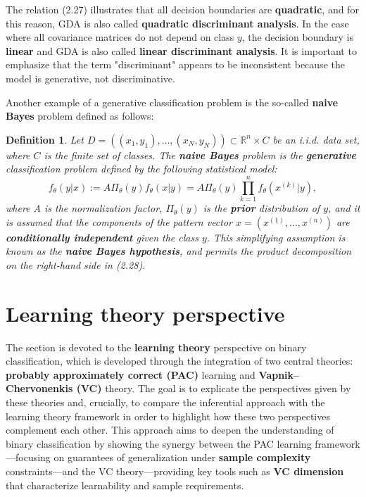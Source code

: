 \documentclass{report}
\newtheorem{definition}{Definition}[chapter]
\begin{document}
The relation (2.27) illustrates that all decision boundaries are \textbf{quadratic}, and for this reason, GDA is also called \textbf{quadratic discriminant analysis}. In the case where all covariance matrices do not depend on class $y$, the decision boundary is \textbf{linear} and GDA is also called \textbf{linear discriminant analysis}. It is important to emphasize that the term "discriminant" appears to be inconsistent because the model is generative, not discriminative.

Another example of a generative classification problem is the so-called \textbf{naive Bayes} problem defined as follows:

\begin{definition}
Let $D = ((x_1,y_1),\dots,(x_N,y_N)) \subset \mathbb{R}^n\times C$ be an i.i.d. data set, where $C$ is the finite set of classes. The \textbf{naive Bayes} problem is the \textbf{generative} classification problem defined by the following statistical model:
\begin{equation}
f_\theta(y|x) := A\Pi_\theta(y)f_\theta(x|y) = A \Pi_\theta(y)\prod_{k=1}^nf_\theta(x^{(k)}|y),
\end{equation}
where A is the normalization factor, $\Pi_\theta(y)$ is the \textbf{prior} distribution of $y$, and it is assumed that the components of the pattern vector $x = (x^{(1)},\dots,x^{(n)})$ are \textbf{conditionally independent} given the class $y$. This simplifying assumption is known as the \textbf{naive Bayes hypothesis}, and permits the product decomposition on the right-hand side in (2.28).
\end{definition}

\section{Learning theory perspective}
The section is devoted to the \textbf{learning theory} perspective on binary classification, which is developed through the integration of two central theories: \textbf{probably approximately correct (PAC)} learning and \textbf{Vapnik–Chervonenkis (VC)} theory. The goal is to explicate the perspectives given by these theories and, crucially, to compare the inferential approach with the learning theory framework in order to highlight how these two perspectives complement each other. This approach aims to deepen the understanding of binary classification by showing the synergy between the PAC learning framework—focusing on guarantees of generalization under \textbf{sample complexity} constraints—and the VC theory—providing key tools such as \textbf{VC dimension} that characterize learnability and sample requirements.
\end{document}
